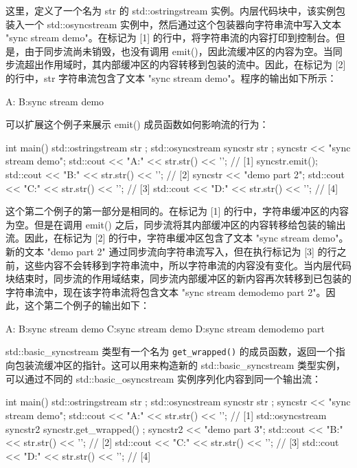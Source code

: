 这里，定义了一个名为 str 的 std::ostringstream 实例。内层代码块中，该实例包装入一个 std::osyncstream 实例中，然后通过这个包装器向字符串流中写入文本 "sync stream demo"。在标记为 [1] 的行中，将字符串流的内容打印到控制台。但是，由于同步流尚未销毁，也没有调用 emit()，因此流缓冲区的内容为空。当同步流超出作用域时，其内部缓冲区的内容转移到包装的流中。因此，在标记为 [2] 的行中，str 字符串流包含了文本 "sync stream demo"。程序的输出如下所示：

\begin{shell}
A:
B:sync stream demo
\end{shell}

可以扩展这个例子来展示 emit() 成员函数如何影响流的行为：

\begin{cpp}
int main()
{
    std::ostringstream str{ };
    {
        std::osyncstream syncstr{ str };
        syncstr << "sync stream demo";
        std::cout << "A:" << str.str() << '\n'; // [1]
        syncstr.emit();
        std::cout << "B:" << str.str() << '\n'; // [2]
        syncstr << "demo part 2";
        std::cout << "C:" << str.str() << '\n'; // [3]
    }
    std::cout << "D:" << str.str() << '\n';    // [4]
}
\end{cpp}

这个第二个例子的第一部分是相同的。在标记为 [1] 的行中，字符串缓冲区的内容为空。但是在调用 emit() 之后，同步流将其内部缓冲区的内容转移给包装的输出流。因此，在标记为 [2] 的行中，字符串缓冲区包含了文本 "sync stream demo"。新的文本 "demo part 2" 通过同步流向字符串流写入，但在执行标记为 [3] 的行之前，这些内容不会转移到字符串流中，所以字符串流的内容没有变化。当内层代码块结束时，同步流的作用域结束，同步流内部缓冲区的新内容再次转移到已包装的字符串流中，现在该字符串流将包含文本 "sync stream demodemo part 2"。因此，这个第二个例子的输出如下：

\begin{shell}
A:
B:sync stream demo
C:sync stream demo
D:sync stream demodemo part
\end{shell}

std::basic\_syncstream 类型有一个名为 \verb|get_wrapped()| 的成员函数，返回一个指向包装流缓冲区的指针。这可以用来构造新的 std::basic\_syncstream 类型实例，可以通过不同的 std::basic\_osyncstream 实例序列化内容到同一个输出流：

\begin{cpp}
int main()
{
    std::ostringstream str{ };
    {
        std::osyncstream syncstr{ str };
        syncstr << "sync stream demo";
        std::cout << "A:" << str.str() << '\n';    // [1]
        {
            std::osyncstream syncstr2{ syncstr.get_wrapped() };
            syncstr2 << "demo part 3";
            std::cout << "B:" << str.str() << '\n'; // [2]
        }
        std::cout << "C:" << str.str() << '\n';    // [3]
    }
    std::cout << "D:" << str.str() << '\n';       // [4]
}
\end{cpp}

